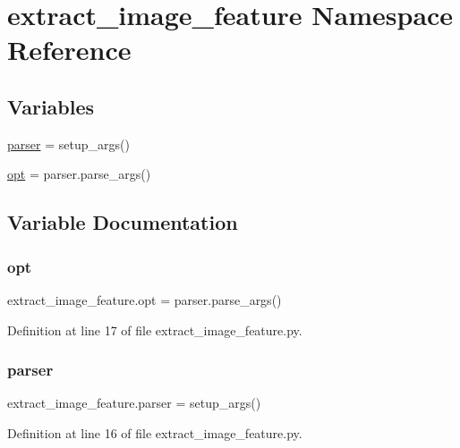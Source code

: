 \hypertarget{namespaceextract__image__feature}{}\section{extract\+\_\+image\+\_\+feature Namespace Reference}
\label{namespaceextract__image__feature}
\subsection*{Variables}
\begin{DoxyCompactItemize}
\item 
\hyperlink{namespaceextract__image__feature_a1e5cbaf17333e7b3a192b412853970f1}{parser} = setup\+\_\+args()
\item 
\hyperlink{namespaceextract__image__feature_a5ee41ae45390d90a69a131d60b829604}{opt} = parser.\+parse\+\_\+args()
\end{DoxyCompactItemize}


\subsection{Variable Documentation}
\mbox{\label{namespaceextract__image__feature_a5ee41ae45390d90a69a131d60b829604}} 
\subsubsection{\texorpdfstring{opt}{opt}}
{\footnotesize\ttfamily extract\+\_\+image\+\_\+feature.\+opt = parser.\+parse\+\_\+args()}



Definition at line 17 of file extract\+\_\+image\+\_\+feature.\+py.

\mbox{\label{namespaceextract__image__feature_a1e5cbaf17333e7b3a192b412853970f1}} 
\subsubsection{\texorpdfstring{parser}{parser}}
{\footnotesize\ttfamily extract\+\_\+image\+\_\+feature.\+parser = setup\+\_\+args()}



Definition at line 16 of file extract\+\_\+image\+\_\+feature.\+py.

